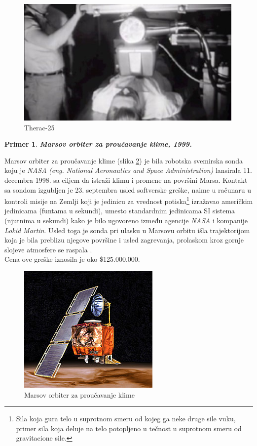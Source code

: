 \documentclass[a4paper]{article}
\newtheorem{primer}{Primer}[section]
\begin{document}
\begin{figure}[h!]
\begin{center}
\includegraphics[scale=0.45]{therac}
\end{center}
\caption{Therac-25}
\label{fig:therac-25}
\end{figure}

\newpage

\begin{primer}
\textbf{Marsov orbiter za proučavanje klime, 1999.}
\end{primer}
Marsov orbiter za proučavanje klime (slika \ref{fig:mco}) je bila robotska svemirska sonda koju je \emph{NASA} \emph{(eng. National Aeronautics and Space Administration)} lansirala 11. decembra 1998. sa ciljem da istraži klimu i promene na površini Marsa. Kontakt sa sondom izgubljen je 23. septembra usled softverske greške, naime u računaru u kontroli misije na Zemlji koji je jedinicu za vrednost potiska\footnote{ Sila koja gura telo u suprotnom smeru od kojeg ga neke druge sile vuku, primer sila koja deluje na telo potopljeno u tečnost u suprotnom smeru od gravitacione sile.} izražavao američkim jedinicama (funtama u sekundi), umesto standardnim jedinicama SI sistema (njutnima u sekundi) kako je bilo ugovoreno između agencije \emph{NASA} i kompanije \emph{Lokid Martin}. Usled toga je sonda pri ulasku u Marsovu orbitu išla trajektorijom koja je bila preblizu njegove površine i usled zagrevanja, prolaskom kroz gornje slojeve atmosfere se raspala \cite{mars}.\\
Cena ove greške iznosila je oko \$125.000.000.

\begin{figure}[h!]
\begin{center}
\includegraphics[scale=0.45]{MCO}
\end{center}
\caption{Marsov orbiter za proučavanje klime}
\label{fig:mco}
\end{figure}
\end{document}
